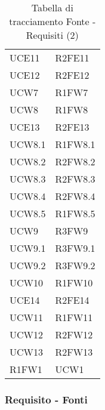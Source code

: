 \begin{table}[!htbp]
\begin{tabular}{ m{}<{\centering}  m{}<{\centering} }
	UCE11 & R2FE11\\
	 
	UCE12 & R2FE12 \\			
	 
	UCW7 & R1FW7 \\	
	 
	UCW8 & R1FW8 \\		
	
	UCE13 & R2FE13  \\	
	 
	UCW8.1 & R1FW8.1 \\	
	 
	UCW8.2 & R2FW8.2 \\	
	 
	UCW8.3 & R2FW8.3\\	
	 
	UCW8.4 & R2FW8.4 \\	 
	 
	UCW8.5 & R1FW8.5 \\	 
	 
	UCW9 & R3FW9 \\	
	 
	UCW9.1 & R3FW9.1\\	 
	 
	UCW9.2 & R3FW9.2\\	  
	 
	UCW10 & R1FW10 \\	 
	 
	UCE14 & R2FE14\\	 
	 	 
	UCW11 & R1FW11\\	 	 	 	

	UCW12 & R2FW12\\

	UCW13 & R2FW13 \\

	R1FW1 & UCW1 \\

\end{tabular}
\caption{Tabella di tracciamento Fonte - Requisiti (2)}
\end{table}

\pagebreak

\subsubsection{Requisito - Fonti}

